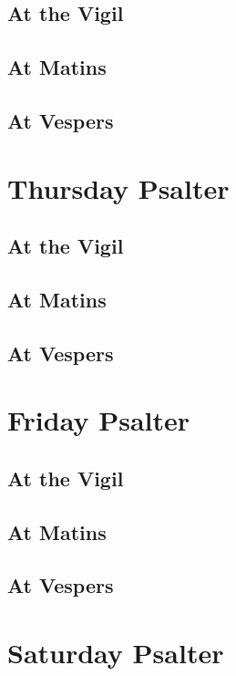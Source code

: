 \documentclass[14pt,openany]{book}
\begin{document}
			\section{At the Vigil}
			
			\section{At Matins}
			
			\section{At Vespers}
			
		\chapter{Thursday Psalter}
		
			\section{At the Vigil}
			
			\section{At Matins}
			
			\section{At Vespers}
			
		\chapter{Friday Psalter}
		
			\section{At the Vigil}
			
			\section{At Matins}
			
			\section{At Vespers}
			
		\chapter{Saturday Psalter}
		
\end{document}
